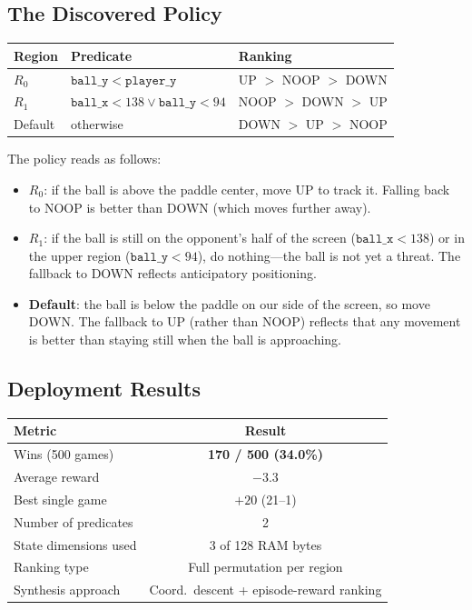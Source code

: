 \documentclass[9pt,a4paper]{article}
\theoremstyle{plain}
\theoremstyle{definition}
\theoremstyle{remark}
\begin{document}
\subsection{The Discovered Policy}

\begin{center}
\begin{tabular}{lll}
\toprule
\textbf{Region} & \textbf{Predicate} & \textbf{Ranking} \\
\midrule
$R_0$ & $\mathtt{ball\_y} < \mathtt{player\_y}$
  & UP $>$ NOOP $>$ DOWN \\
$R_1$ & $\mathtt{ball\_x} < 138 \lor \mathtt{ball\_y} < 94$
  & NOOP $>$ DOWN $>$ UP \\
Default & \textrm{otherwise}
  & DOWN $>$ UP $>$ NOOP \\
\bottomrule
\end{tabular}
\end{center}

The policy reads as follows:
\begin{itemize}
\item \textbf{$R_0$}: if the ball is above the paddle center, move
  UP to track it. Falling back to NOOP is better than DOWN (which
  moves further away).
\item \textbf{$R_1$}: if the ball is still on the opponent's half
  of the screen ($\mathtt{ball\_x} < 138$) or in the upper region
  ($\mathtt{ball\_y} < 94$), do nothing---the ball is not yet a
  threat. The fallback to DOWN reflects anticipatory positioning.
\item \textbf{Default}: the ball is below the paddle on our side
  of the screen, so move DOWN. The fallback to UP (rather than NOOP)
  reflects that any movement is better than staying still when the
  ball is approaching.
\end{itemize}

\subsection{Deployment Results}

\begin{center}
\begin{tabular}{lc}
\toprule
\textbf{Metric} & \textbf{Result} \\
\midrule
Wins (500 games) & \textbf{170 / 500 (34.0\%)} \\
Average reward & $-3.3$ \\
Best single game & $+20$ (21--1) \\
\midrule
Number of predicates & 2 \\
State dimensions used & 3 of 128 RAM bytes \\
Ranking type & Full permutation per region \\
Synthesis approach & Coord.\ descent + episode-reward ranking \\
\bottomrule
\end{tabular}
\end{center}
\end{document}
